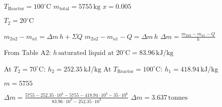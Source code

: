 \( T_{\text{Reactor}} = 100^\circ \text{C} \)  
\( m_{\text{total}} = 5755 \, \text{kg} \)  
\( x = 0.005 \)  

\( T_2 = 20^\circ \text{C} \)  

\( m_{2u2} - m_{u1} = \Delta m \, h + \Sigma Q \)  
\( m_{2u2} - m_{u1} - Q = \Delta m \, h \)  
\( \Delta m = \frac{m_{2u2} - m_{u1} - Q}{h} \)  

From Table A2:  
\( h \, \text{saturated liquid at } 20^\circ \text{C} = 83.96 \, \text{kJ/kg} \)  

At \( T_2 = 70^\circ \text{C} \): \( h_2 = 252.35 \, \text{kJ/kg} \)  
At \( T_{\text{Reactor}} = 100^\circ \text{C} \): \( h_1 = 418.94 \, \text{kJ/kg} \)  

\( m = 5755 \)  

\( \Delta m = \frac{5755 - 252.35 \cdot 10^3 - 5755 - 418.94 \cdot 10^3 - 35 \cdot 10^6}{83.96 \cdot 10^3 - 252.35 \cdot 10^3} \)  
\( \Delta m = 3.637 \, \text{tonnes} \)